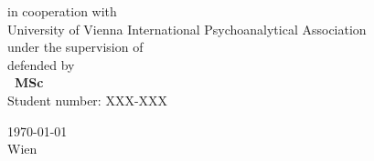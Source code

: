 \documentclass[
12pt, %
nolistspacing, %
liststotoc, %
headsepline, %
consistentlayout, %
]{MastersDoctoralThesis} %
\begin{document}
\begin{titlepage}
\begin{center}
\vfill
\vfill

in cooperation with\\ \large University of Vienna International Psychoanalytical Association\\
\vfill
\vfill
\normalsize under the supervision of\\
\textbf{\supname}
\vfill
\vfill
\normalsize defended by\\
\textbf{\authorname~MSc}\\
\normalsize
Student number: XXX-XXX%
\vfill
\vfill


\vfill

 
\vfill



{\today}\\
Wien

\vfill{}
\vfill{}
 
\vfill
\end{center}
\end{titlepage}




\end{document}
